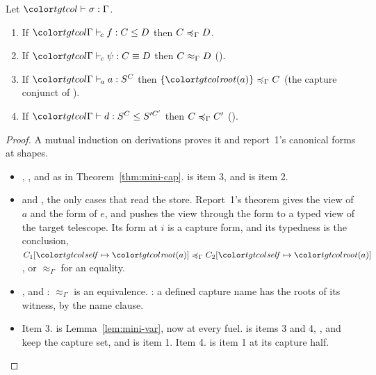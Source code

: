 \begin{theorem}\label{thm:target-canon}
Let $\storej{\sigma}{\Gamma}$.
\begin{enumerate}
\item If $\clej{\Gamma}{f}{C}{D}$ then $C \preccurlyeq_{\Gamma} D$.
\item If $\ceqj{\Gamma}{\psi}{C}{D}$ then $C \approx_{\Gamma} D$ ().
\item If $\atomj{\Gamma}{a}{\capt{S}{C}}$ then $\caple{\Gamma}{\cset{\rt{a}}}{C}$ (the capture conjunct of ).
\item If $\lej{\Gamma}{d}{\capt{S}{C}}{\capt{S'}{C'}}$ then $C \preccurlyeq_{\Gamma} C'$ ().
\end{enumerate}
\end{theorem}

\begin{proof}
A mutual induction on derivations proves it and report~1's canonical forms at shapes.
\begin{itemize}
\item {}, ,  and  as in Theorem~\ref{thm:mini-cap}.  is item 3, and  is item 2.
\item {} and , the only cases that read the store. Report~1's theorem gives the view of $a$ and the form of $e$, and pushes the view through the form to a typed view of the target telescope. Its form at $i$ is a capture form, and its typedness is the conclusion, $\caple{\Gamma}{C_1[\self \mapsto \rt{a}]}{C_2[\self \mapsto \rt{a}]}$, or $\approx_\Gamma$ for an equality.
\item {},  and : $\approx_\Gamma$ is an equivalence. : a defined capture name has the roots of its witness, by the name clause.
\item Item 3.  is Lemma~\ref{lem:mini-var}, now at every fuel.  is items 3 and 4, ,  and  keep the capture set, and  is item 1. Item 4.  is item 1 at its capture half. \qedhere
\end{itemize}
\end{proof}


